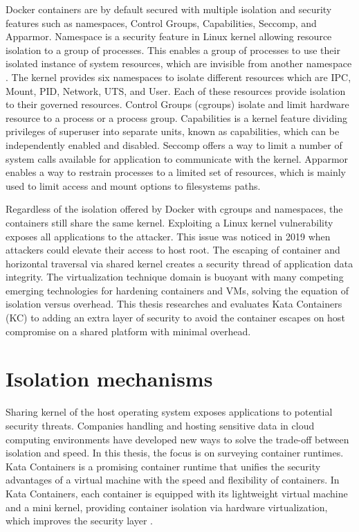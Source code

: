 Docker containers are by default secured with multiple isolation and security features such as namespaces, Control Groups, Capabilities, Seccomp, and Apparmor. Namespace is a security feature in Linux kernel allowing resource isolation to a group of processes. This enables a group of processes to use their isolated instance of system resources, which are invisible from another namespace . The kernel provides six namespaces to isolate different resources which are IPC, Mount, PID, Network, UTS, and User. Each of these resources provide isolation to their governed resources. Control Groups (cgroups) isolate and limit hardware resource to a process or a process group. Capabilities is a kernel feature dividing privileges of superuser into separate units, known as capabilities, which can be independently enabled and disabled. Seccomp offers a way to limit a number of system calls available for application to communicate with the kernel. Apparmor enables a way to restrain processes to a limited set of resources, which is mainly used to limit access and mount options to filesystems paths. \cite{Flauzac2020}

Regardless of the isolation offered by Docker with cgroups and namespaces, the containers still share the same kernel. Exploiting a Linux kernel vulnerability exposes all applications to the attacker. This issue was noticed in 2019 \cite{CVE-2020-14386}\cite{CVE-2019-5736} when attackers could elevate their access to host root. The escaping of container and horizontal traversal via shared kernel creates a security thread of application data integrity. The virtualization technique domain is buoyant with many competing emerging technologies for hardening containers and VMs, solving the equation of isolation versus overhead. This thesis researches and evaluates Kata Containers (KC) to adding an extra layer of security to avoid the container escapes on host compromise on a shared platform with minimal overhead. \cite{EdgeComputing5G}

\section{Isolation mechanisms}

Sharing kernel of the host operating system exposes applications to potential security threats. Companies handling and hosting sensitive data in cloud computing environments have developed new ways to solve the trade-off between isolation and speed. In this thesis, the focus is on surveying container runtimes. Kata Containers is a promising container runtime that unifies the security advantages of a virtual machine with the speed and flexibility of containers. In Kata Containers, each container is equipped with its lightweight virtual machine and a mini kernel, providing container isolation via hardware virtualization, which improves the security layer \cite{Kumar2020}.


